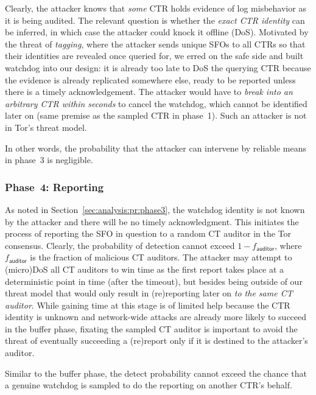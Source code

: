 Clearly, the attacker knows that \emph{some} CTR holds evidence of log
misbehavior as it is being audited.  The relevant question is whether the
\emph{exact CTR identity} can be inferred, in which case the attacker could
knock it offline (DoS).  Motivated by the threat of \emph{tagging}, where the
attacker sends unique SFOs to all CTRs so that their identities are revealed
once queried for, we erred on the safe side and built watchdog into our design:
	it is already too late to DoS the querying CTR because the evidence is
	already replicated somewhere else, ready to be reported unless there is a
	timely acknowledgement.
The attacker would have to \emph{break into an arbitrary CTR within seconds} to
cancel the watchdog, which cannot be identified later on (same premise as
the sampled CTR in phase~1).  Such an attacker is not in Tor's threat model.

In other words, the probability that the attacker can intervene by reliable
means in phase~3 is negligible.

\subsubsection{Phase~4: Reporting} \label{sec:analysis:pr:phase4}
As noted in Section~\ref{sec:analysis:pr:phase3}, the watchdog identity is not
known by the attacker and there will be no timely acknowledgment.  This
initiates the process of reporting the SFO in question to a random CT auditor in
the Tor consensus.  Clearly, the probability of detection cannot exceed
$1-f_{\mathsf{auditor}}$, where $f_{\mathsf{auditor}}$ is the fraction of
malicious CT auditors.  The attacker may attempt to (micro)DoS all CT auditors
to win time as the first report takes place at a deterministic point in time
(after the timeout), but besides being outside of our threat model that would
only result in (re)reporting later on \emph{to the same CT auditor}.
While gaining time at this stage is of limited help because the CTR identity is
unknown and network-wide attacks are already more likely to succeed in the
buffer phase, fixating the sampled CT auditor is important to avoid the threat
of eventually succeeding a (re)report only if it is destined to the attacker's
auditor.

Similar to the buffer phase, the detect probability cannot exceed the chance
that a genuine watchdog is sampled to do the reporting on another CTR's behalf.
